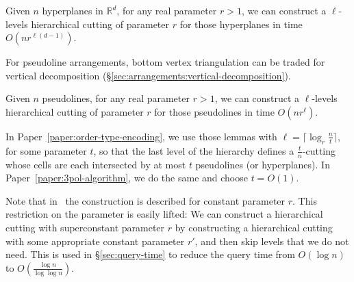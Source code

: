 \begin{lemma}\label{lem:hierarchical-cutting-d}
Given \(n\) hyperplanes in \(\mathbb{R}^d\), for any real parameter \(r >
1\), we can construct a \(\ell\)-levels hierarchical cutting of parameter
\(r\) for those hyperplanes in time \(O(nr^{\ell(d-1)})\).
\end{lemma}

For pseudoline arrangements, bottom vertex triangulation can be traded for
vertical decomposition
(\S\ref{sec:arrangements:vertical-decomposition}).
\begin{lemma}\label{lem:hierarchical-cutting-2}
Given \(n\) pseudolines, for any real parameter \(r > 1\), we can construct
a \(\ell\)-levels hierarchical cutting of parameter
\(r\) for those pseudolines in time \(O(nr^\ell)\).
\end{lemma}

In Paper~\ref{paper:order-type-encoding},
we use those lemmas with
\(\ell = \lceil \log_r \frac nt \rceil\),
for some parameter \(t\),
so that the last level of the hierarchy defines a \(\frac
tn\)-cutting whose cells are each intersected by at most \(t\) pseudolines (or
hyperplanes).
%
In Paper~\ref{paper:3pol-algorithm},
we do the same and choose \(t = O(1)\).

Note that in~\cite{C93} the construction is described for constant
parameter \(r\).
This restriction on the parameter is easily lifted:
We can construct a hierarchical
cutting with superconstant parameter \(r\) by constructing a hierarchical
cutting with some appropriate constant parameter \(r'\), and then skip levels that we do
not need. This is used in \S\ref{sec:query-time} to reduce the query time
from \(O(\log n)\) to \(O(\frac{\log n}{\log \log n})\).
